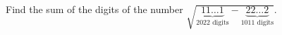 Find the sum of the digits of the number $\sqrt{\underbrace{11\ldots1}_{2022\text{ digits}}-\underbrace{22\ldots2}_{1011\text{ digits}}}$.
